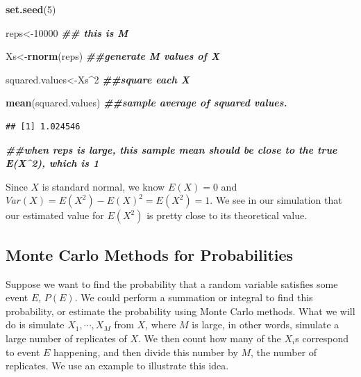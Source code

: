 \documentclass[
]{book}
\newenvironment{Shaded}{\begin{snugshade}}{\end{snugshade}}
\newcommand{\DecValTok}[1]{\textcolor[rgb]{0.00,0.00,0.81}{#1}}
\newcommand{\DocumentationTok}[1]{\textcolor[rgb]{0.56,0.35,0.01}{\textbf{\textit{#1}}}}
\newcommand{\FunctionTok}[1]{\textcolor[rgb]{0.13,0.29,0.53}{\textbf{#1}}}
\newcommand{\NormalTok}[1]{#1}
\newcommand{\OtherTok}[1]{\textcolor[rgb]{0.56,0.35,0.01}{#1}}
\newcommand{\SpecialCharTok}[1]{\textcolor[rgb]{0.81,0.36,0.00}{\textbf{#1}}}
\begin{document}
\begin{Shaded}
\begin{Highlighting}[]
\FunctionTok{set.seed}\NormalTok{(}\DecValTok{5}\NormalTok{)}

\NormalTok{reps}\OtherTok{\textless{}{-}}\DecValTok{10000} \DocumentationTok{\#\# this is M}

\NormalTok{Xs}\OtherTok{\textless{}{-}}\FunctionTok{rnorm}\NormalTok{(reps) }\DocumentationTok{\#\#generate M values of X}

\NormalTok{squared.values}\OtherTok{\textless{}{-}}\NormalTok{Xs}\SpecialCharTok{\^{}}\DecValTok{2} \DocumentationTok{\#\#square each X}

\FunctionTok{mean}\NormalTok{(squared.values) }\DocumentationTok{\#\#sample average of squared values. }
\end{Highlighting}
\end{Shaded}

\begin{verbatim}
## [1] 1.024546
\end{verbatim}

\begin{Shaded}
\begin{Highlighting}[]
\DocumentationTok{\#\#when reps is large, this sample mean should be close to the true E(X\^{}2), which is 1}
\end{Highlighting}
\end{Shaded}

Since \(X\) is standard normal, we know \(E(X) = 0\) and \(Var(X) = E(X^2) - E(X)^2 = E(X^2) = 1\). We see in our simulation that our estimated value for \(E(X^2)\) is pretty close to its theoretical value.

\hypertarget{monte-carlo-methods-for-probabilities}{%
\subsection{Monte Carlo Methods for Probabilities}\label{monte-carlo-methods-for-probabilities}}

Suppose we want to find the probability that a random variable satisfies some event \(E\), \(P(E)\). We could perform a summation or integral to find this probability, or estimate the probability using Monte Carlo methods. What we will do is simulate \(X_1, \cdots, X_M\) from \(X\), where \(M\) is large, in other words, simulate a large number of replicates of \(X\). We then count how many of the \(X_i\)s correspond to event \(E\) happening, and then divide this number by \(M\), the number of replicates. We use an example to illustrate this idea.
\end{document}
